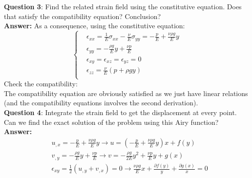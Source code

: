 \noindent \textbf{Question 3}: Find the related strain field using the constitutive equation. Does that satisfy the compatibility equation? Conclusion? \\

\textbf{Answer:}
As a consequence, using the constitutive equation:
\begin{equation}
\left\lbrace
\begin{split}
& \epsilon_{xx}=\frac{1}{E}\sigma_{xx} - \frac{\nu}{E}\sigma_{yy} = -\frac{p}{E}+\frac{\nu \rho g}{E} y \\
& \epsilon_{yy}=-\frac{\rho g}{E} y + \frac{\nu p}{E} \\
& \epsilon_{xy}=\epsilon_{xz}=\epsilon_{yz}=0 \\
& \epsilon_{zz}=\frac{\nu}{E} \left( p+\rho gy \right)  \\
\end{split}
\right.
\end{equation}
Check the compatibility:\\
The compatibility equation are obviously satisfied as we just have linear relations (and the compatibility equations involves the second derivation).
\\

\noindent \textbf{Question 4}: Integrate the strain field to get the displacement at every point. Can we find the exact solution of the problem using this Airy function?\\

\textbf{Answer:}
\begin{equation}
\begin{split}
& u_{,x}=-\frac{p}{E}+\frac{\nu \rho g}{E}y \rightarrow u=\left( -\frac{p}{E}+\frac{\nu \rho g}{E}y \right) x +f(y) \\
& v_{,y}=-\frac{\rho g}{E}y+\frac{\nu p}{E} \rightarrow v= -\frac{\rho g}{2E}y^2+\frac{\nu p}{E}y +g(x) \\
& \epsilon_{xy} = \frac{1}{2} (u_{,y}+v_{,x}) = 0 \rightarrow 
\frac{\nu \rho g}{E}x + \frac{\partial f(y)}{y} + \frac{\partial g(x)}{x}=0 \\
\end{split}
\end{equation}

